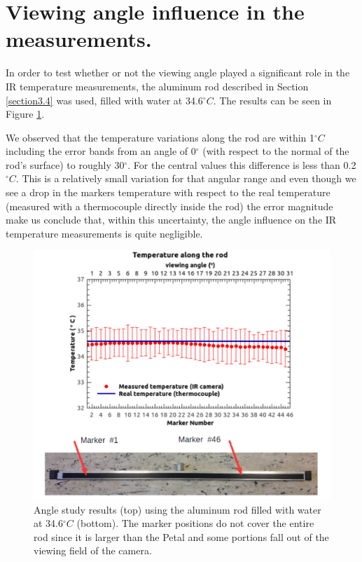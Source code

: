 	\section{Viewing angle influence in the measurements.}\label{section4.5}
	
		In order to test whether or not the viewing angle played a significant role in the IR temperature measurements, the aluminum rod described in Section \ref{section3.4} was used, filled with water at 34.6\space$^\circ C$. The results can be seen in Figure \ref{fig4.8}. 
		
		We observed that the temperature variations along the rod are within 1\space$^\circ C$ including the error bands from an angle of 0$^\circ$ (with respect to the normal of the rod’s surface) to roughly 30$^\circ$. For the central values this difference is less than 0.2\space$^\circ C$. This is a relatively small variation for that angular range and even though we see a drop in the markers temperature with respect to the real temperature (measured with a thermocouple directly inside the rod) the error magnitude make us conclude that, within this uncertainty, the angle influence on the IR temperature measurements is quite negligible.
		
		\begin{figure}[ht!]
			\centering
			\captionsetup{justification=centering,margin=0cm}
			\includegraphics[scale=0.4]{Figures/Chapter04/RodAngularTempResults.pdf}
			\caption{Angle study results (top) using the aluminum rod filled with water at 34.6\space$^\circ C$ (bottom). The marker positions do not cover the entire rod since it is larger than the Petal and some portions fall out of the viewing field of the camera.}\label{fig4.8}
		\end{figure}
	
	